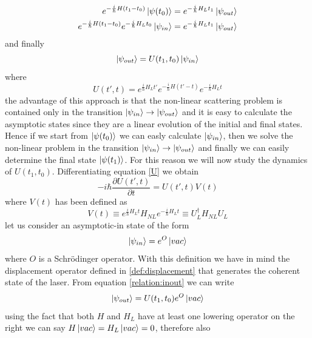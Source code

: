 \documentclass[12pt]{book}
\begin{document}
\begin{equation}
\begin{split}
e^{-\frac{i}{\hbar}H (t_1-t_0)}\ket{\psi(t_0)} = e^{-\frac{i}{\hbar}H_L t_1}\ket{\psi_{out}} \\
e^{-\frac{i}{\hbar}H (t_1-t_0)}e^{-\frac{i}{\hbar}H_Lt_0}\ket{\psi_{in}} = e^{-\frac{i}{\hbar}H_L t_1}\ket{\psi_{out}}
\end{split}
\end{equation}
and finally
\begin{equation}\label{relation:inout}\ket{\psi_{out}} = U(t_1,t_0) \ket{\psi_{in}}\end{equation}
where 
\begin{equation}\label{U}
U(t',t) = e^{\frac{i}{\hbar}H_Lt'}e^{-\frac{i}{\hbar}H(t'-t)}e^{-\frac{i}{\hbar}H_Lt}
\end{equation}
the advantage of this approach is that the non-linear scattering problem is contained only in the transition $\ket{\psi_{in}} \to \ket{\psi_{out}}$ and it is easy to calculate the asymptotic states since they are a linear evolution of the initial and final states. Hence if we start from $\ket{\psi(t_0)}$ we can easly calculate $\ket{\psi_{in}}$, then we solve the non-linear problem in the transition $\ket{\psi_{in}} \to \ket{\psi_{out}}$ and finally we can easily determine the final state $\ket{\psi(t_1)}$. For this reason we will now study the dynamics of $U(t_1,t_0)$. Differentiating equation \eqref{U} we obtain
\begin{equation}\label{dynamicU}-i\hbar \frac{\partial U(t',t)}{\partial t} = U(t',t)V(t)\end{equation}
where $V(t)$ has been defined as
\begin{equation}V(t) \equiv  e^{\frac{i}{\hbar}H_Lt}H_{NL}e^{-\frac{i}{\hbar}H_Lt} \equiv U_L^\dagger H_{NL} U_L\end{equation}
let us consider an asymptotic-in state of the form 
\begin{equation}\ket{\psi_{in}} = e^O \ket{vac}\end{equation}
where $O$ is a Schr{\"o}dinger operator. With this definition we have in mind the displacement operator defined in \eqref{def:displacement} that generates the coherent state of the laser. From equation \eqref{relation:inout} we can write
\begin{equation}\label{outfinal}\ket{\psi_{out}} = U(t_1,t_0)e^O \ket{vac}\end{equation}
using the fact that both $H$ and $H_L$ have at least one lowering operator on the right we can say $H\ket{vac} = H_L\ket{vac} = 0$, therefore also
\end{document}
